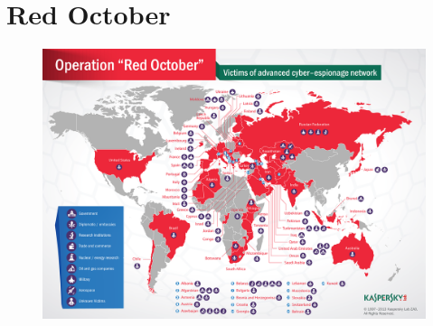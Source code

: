 \documentclass[article, french]{yReport}
\begin{document}
	\section{Red October}
	\begin{figure}[ht!]
		\vspace*{3mm}
		\begin{centered}
			\includegraphics[width=\linewidth]{images/redOctober.png}
		\end{centered}
		\vspace*{5mm}
	\end{figure}
	
\end{document}
